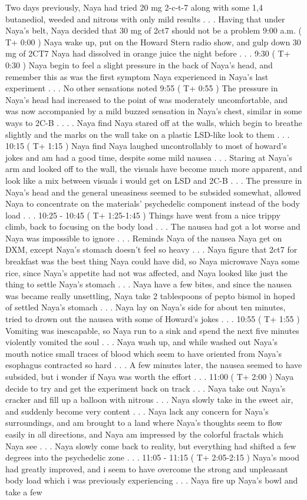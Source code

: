 \documentclass[12pt]{book}
\begin{document}
Two days previously, Naya had tried 20 mg 2-c-t-7 along with some 1,4 butanediol, weeded and nitrous with only mild results . . .  Having that under Naya's belt, Naya decided that 30 mg of 2ct7 should not be a problem 9:00 a.m. ( T+ 0:00 ) Naya wake up, put on the Howard Stern radio show, and gulp down 30 mg of 2CT7 Naya had dissolved in orange juice the night before . . .  9:30 ( T+ 0:30 ) Naya begin to feel a slight pressure in the back of Naya's head, and remember this as was the first symptom Naya experienced in Naya's last experiment . . .  No other sensations noted 9:55 ( T+ 0:55 ) The pressure in Naya's head had increased to the point of was moderately uncomfortable, and was now accompanied by a mild buzzed sensation in Naya's chest, similar in some ways to 2C-B . . .  . Naya find Naya stared off at the walls, which begin to breathe slightly and the marks on the wall take on a plastic LSD-like look to them . . .  10:15 ( T+ 1:15 ) Naya find Naya laughed uncontrollably to most of howard's jokes and am had a good time, despite some mild nausea . . .  Staring at Naya's arm and looked off to the wall, the visuals have become much more apparent, and look like a mix between visuals i would get on LSD and 2C-B . . .  The pressure in Naya's head and the general uneasiness seemed to be subsided somewhat, allowed Naya to concentrate on the materials' psychedelic component instead of the body load . . .  10:25 - 10:45 ( T+ 1:25-1:45 ) Things have went from a nice trippy climb, back to focusing on the body load . . .  The nausea had got a lot worse and Naya was impossible to ignore . . .  Reminds Naya of the nausea Naya get on DXM, except Naya's stomach doesn't feel so heavy . . .  Naya figure that 2ct7 for breakfast was the best thing Naya could have did, so Naya microwave Naya some rice, since Naya's appetite had not was affected, and Naya looked like just the thing to settle Naya's stomach . . .  Naya have a few bites, and since the nausea was became really unsettling, Naya take 2 tablespoons of pepto bismol in hoped of settled Naya's stomach . . .  Naya lay on Naya's side for about ten minutes, tried to drown out the nausea with some of Howard's jokes . . .  10:55 ( T+ 1:55 ) Vomiting was inescapable, so Naya run to a sink and spend the next five minutes violently vomited the soul . . .  Naya wash up, and while washed out Naya's mouth notice small traces of blood which seem to have oriented from Naya's esophagus contracted so hard . . .  A few minutes later, the nausea seemed to have subsided, but i wonder if Naya was worth the effort . . .  11:00 ( T+ 2:00 ) Naya decide to try and get the experiment back on track . . .  Naya take out Naya's cracker and fill up a balloon with nitrous . . .  Naya slowly take in the sweet air, and suddenly become very content . . .  Naya lack any concern for Naya's surroundings, and am brought to a land where Naya's thoughts seem to flow easily in all directions, and Naya am impressed by the colorful fractals which Naya see . . .  Naya slowly come back to reality, but everything had shifted a few degrees into the psychedelic zone . . .  11:05 - 11:15 ( T+ 2:05-2:15 ) Naya's mood had greatly improved, and i seem to have overcome the strong and unpleasant body load which i was previously experiencing . . .  Naya fire up Naya's bowl and take a few 
\end{document}
